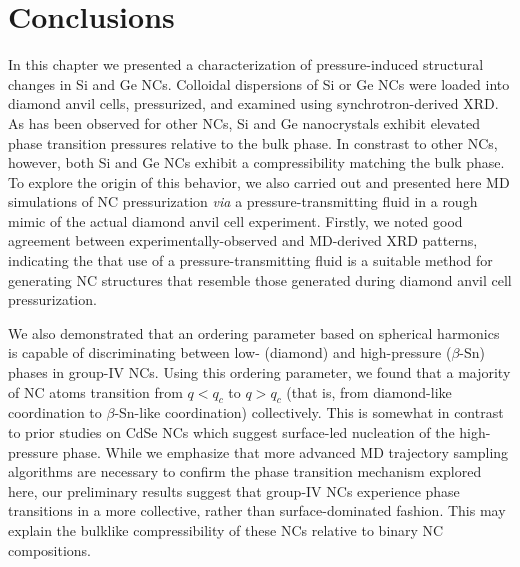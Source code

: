 \section{Conclusions}
In this chapter we presented a characterization of pressure-induced structural changes in Si and Ge NCs. Colloidal dispersions of Si or Ge NCs were loaded into diamond anvil cells, pressurized, and examined using synchrotron-derived XRD. As has been observed for other NCs, Si and Ge nanocrystals exhibit elevated phase transition pressures relative to the bulk phase. In constrast to other NCs, however, both Si and Ge NCs exhibit a compressibility matching the bulk phase. To explore the origin of this behavior, we also carried out and presented here MD simulations of NC pressurization \emph{via} a pressure-transmitting fluid in a rough mimic of the actual diamond anvil cell experiment. Firstly, we noted good agreement between experimentally-observed and MD-derived XRD patterns, indicating the that use of a pressure-transmitting fluid is a suitable method for generating NC structures that resemble those generated during diamond anvil cell pressurization.\par
We also demonstrated that an ordering parameter based on spherical harmonics is capable of discriminating between low- (diamond) and high-pressure ($\beta$-Sn) phases in group-IV NCs. Using this ordering parameter, we found that a majority of NC atoms transition from $q < q_c$ to $q > q_c$ (that is, from diamond-like coordination to $\beta$-Sn-like coordination) collectively. This is somewhat in contrast to prior studies on CdSe NCs which suggest surface-led nucleation of the high-pressure phase. While we emphasize that more advanced MD trajectory sampling algorithms are necessary to confirm the phase transition mechanism explored here, our preliminary results suggest that group-IV NCs experience phase transitions in a more collective, rather than surface-dominated fashion. This may explain the bulklike compressibility of these NCs relative to binary NC compositions.
